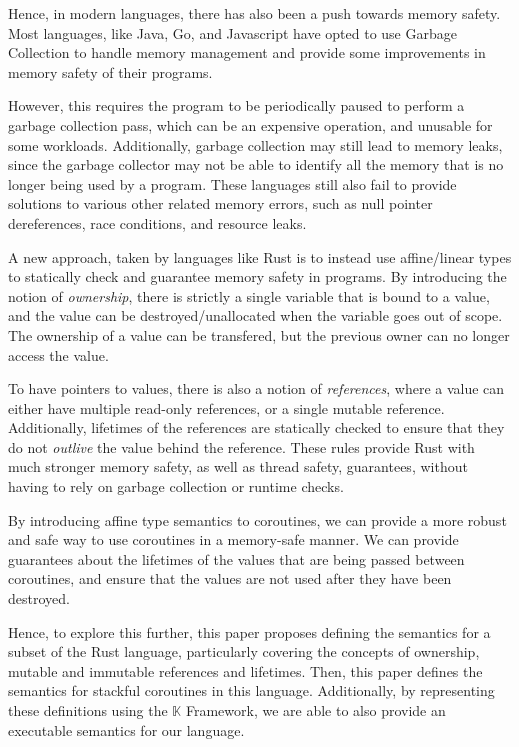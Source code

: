 \documentclass[review,twocolumn,preprint]{sigplanconf}
\begin{document}
Hence, in modern languages, there has also been a push towards memory safety. Most languages, like Java, Go, and Javascript have opted to use Garbage Collection to handle memory management and provide some improvements in memory safety of their programs.

However, this requires the program to be periodically paused to perform a garbage collection pass, which can be an expensive operation, and unusable for some workloads. Additionally, garbage collection may still lead to memory leaks, since the garbage collector may not be able to identify all the memory that is no longer being used by a program. These languages still also fail to provide solutions to various other related memory errors, such as null pointer dereferences, race conditions, and resource leaks.

A new approach, taken by languages like Rust is to instead use affine/linear types to statically check and guarantee memory safety in programs. By introducing the notion of \textit{ownership}, there is strictly a single variable that is bound to a value, and the value can be destroyed/unallocated when the variable goes out of scope. The ownership of a value can be transfered, but the previous owner can no longer access the value.

To have pointers to values, there is also a notion of \textit{references}, where a value can either have multiple read-only references, or a single mutable reference. Additionally, lifetimes of the references are statically checked to ensure that they do not \textit{outlive} the value behind the reference. These rules provide Rust with much stronger memory safety, as well as thread safety, guarantees, without having to rely on garbage collection or runtime checks.


By introducing affine type semantics to coroutines, we can provide a more robust and safe way to use coroutines in a memory-safe manner. We can provide guarantees about the lifetimes of the values that are being passed between coroutines, and ensure that the values are not used after they have been destroyed.

Hence, to explore this further, this paper proposes defining the semantics for a subset of the Rust language, particularly covering the concepts of ownership, mutable and immutable references and lifetimes. Then, this paper defines the semantics for stackful coroutines in this language. Additionally, by representing these definitions using the $\mathbb{K}$ Framework, we are able to also provide an executable semantics for our language.
\end{document}
